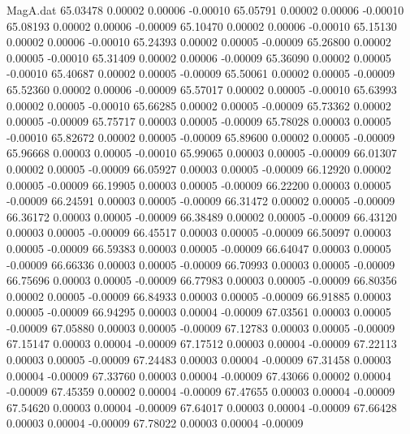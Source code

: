 \begin{filecontents}{MagA.dat}
  65.03478    0.00002    0.00006   -0.00010
  65.05791    0.00002    0.00006   -0.00010
  65.08193    0.00002    0.00006   -0.00009
  65.10470    0.00002    0.00006   -0.00010
  65.15130    0.00002    0.00006   -0.00010
  65.24393    0.00002    0.00005   -0.00009
  65.26800    0.00002    0.00005   -0.00010
  65.31409    0.00002    0.00006   -0.00009
  65.36090    0.00002    0.00005   -0.00010
  65.40687    0.00002    0.00005   -0.00009
  65.50061    0.00002    0.00005   -0.00009
  65.52360    0.00002    0.00006   -0.00009
  65.57017    0.00002    0.00005   -0.00010
  65.63993    0.00002    0.00005   -0.00010
  65.66285    0.00002    0.00005   -0.00009
  65.73362    0.00002    0.00005   -0.00009
  65.75717    0.00003    0.00005   -0.00009
  65.78028    0.00003    0.00005   -0.00010
  65.82672    0.00002    0.00005   -0.00009
  65.89600    0.00002    0.00005   -0.00009
  65.96668    0.00003    0.00005   -0.00010
  65.99065    0.00003    0.00005   -0.00009
  66.01307    0.00002    0.00005   -0.00009
  66.05927    0.00003    0.00005   -0.00009
  66.12920    0.00002    0.00005   -0.00009
  66.19905    0.00003    0.00005   -0.00009
  66.22200    0.00003    0.00005   -0.00009
  66.24591    0.00003    0.00005   -0.00009
  66.31472    0.00002    0.00005   -0.00009
  66.36172    0.00003    0.00005   -0.00009
  66.38489    0.00002    0.00005   -0.00009
  66.43120    0.00003    0.00005   -0.00009
  66.45517    0.00003    0.00005   -0.00009
  66.50097    0.00003    0.00005   -0.00009
  66.59383    0.00003    0.00005   -0.00009
  66.64047    0.00003    0.00005   -0.00009
  66.66336    0.00003    0.00005   -0.00009
  66.70993    0.00003    0.00005   -0.00009
  66.75696    0.00003    0.00005   -0.00009
  66.77983    0.00003    0.00005   -0.00009
  66.80356    0.00002    0.00005   -0.00009
  66.84933    0.00003    0.00005   -0.00009
  66.91885    0.00003    0.00005   -0.00009
  66.94295    0.00003    0.00004   -0.00009
  67.03561    0.00003    0.00005   -0.00009
  67.05880    0.00003    0.00005   -0.00009
  67.12783    0.00003    0.00005   -0.00009
  67.15147    0.00003    0.00004   -0.00009
  67.17512    0.00003    0.00004   -0.00009
  67.22113    0.00003    0.00005   -0.00009
  67.24483    0.00003    0.00004   -0.00009
  67.31458    0.00003    0.00004   -0.00009
  67.33760    0.00003    0.00004   -0.00009
  67.43066    0.00002    0.00004   -0.00009
  67.45359    0.00002    0.00004   -0.00009
  67.47655    0.00003    0.00004   -0.00009
  67.54620    0.00003    0.00004   -0.00009
  67.64017    0.00003    0.00004   -0.00009
  67.66428    0.00003    0.00004   -0.00009
  67.78022    0.00003    0.00004   -0.00009

\end{filecontents}
